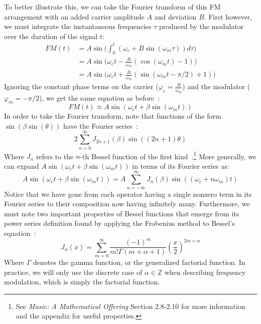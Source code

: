 \documentclass[11pt,twoside]{report}
\newcommand{\w}{\omega}
\numberwithin{thm}{section}
\numberwithin{equation}{section}
\newcommand{\Z}{{\mathbb{Z}}}
\begin{document}
To better illustrate this, we can take the Fourier transform of this FM arrangement with an added carrier amplitude $A$ and deviation $B$. First however, we must integrate the instantaneous frequencies $\tau$ produced by the modulator over the duration of the signal $t$:
\begin{align*}
    FM(t) &= A\sin\bigg(\int_0^t (\w_c + B\sin(\w_m \tau))d\tau\bigg)\\
    &= A\sin\bigg( \w_ct - \frac{B}{\w_m}(\cos(\w_m t) - 1)\bigg)\\
    &= A\sin\bigg( \w_ct + \frac{B}{\w_m}(\sin(\w_m t - \pi/2) + 1)\bigg)
\end{align*}
Ignoring the constant phase terms on the carrier ($\varphi_c = \frac{B}{\w_m}$) and the modulator ($\varphi_m = -\pi/2$), we get the same equation as before~\cite{Chowning_1973}:
\begin{equation}
    FM(t) \approx A\sin(\w_c t + \beta \sin(\w_m t))
\end{equation}
In order to take the Fourier transform, note that functions of the form $\sin(\beta\sin(\theta))$ have the Fourier series~\cite{kreh_2012}:
\begin{equation}
    2\sum_{n=0}^\infty J_{2n+1}(\beta)\sin((2n+1)\theta)
\end{equation}
Where $J_n$ refers to the $n$-th Bessel function of the first kind~\cite{Benson_2006}.\footnote{See \textit{Music: A Mathematical Offering} Section 2.8-2.10 for more information and the appendix for useful properties.} More generally, we can expand $A\sin(\w_c t + \beta \sin(\w_m t))$ in terms of its Fourier series as:
\begin{equation}
    A\sin(\w_c t + \beta \sin(\w_m t)) = A\sum_{n=-\infty}^\infty J_n(\beta)\sin((\w_c + n\w_m)t)
\end{equation}
Notice that we have gone from each operator having a single nonzero term in its Fourier series to their composition now having infinitely many. Furthermore, we must note two important properties of Bessel functions that emerge from its power series definition found by applying the Frobenius method to Bessel's equation~\cite{abramowitz+stegun}:
\begin{equation}
    J_\alpha(x) = \sum_{m=0}^\infty\frac{(-1)^m}{m!\Gamma(m+\alpha+1)}\left(\frac{x}{2}\right)^{2m+\alpha}
\end{equation}
Where $\Gamma$ denotes the gamma function, or the generalized factorial function. In practice, we will only use the discrete case of $ \alpha \in \Z$ when describing frequency modulation, which is simply the factorial function. 
\end{document}
